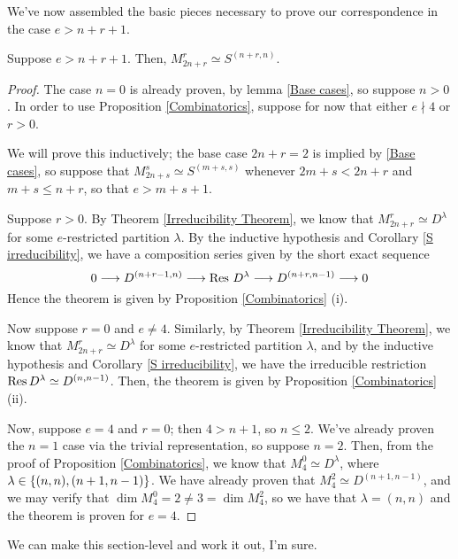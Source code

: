 \documentclass{amsart}
\begin{document}
We've now assembled the basic pieces necessary to prove our correspondence in the case $e > n + r + 1$.

\begin{theorem}\label{Correspondence Theorem}
  Suppose $e > n + r + 1$.
  Then, $M_{2n + r}^r \simeq S^{(n+r,n)}$.
\end{theorem}
\begin{proof}
  The case $n = 0$ is already proven, by lemma \ref{Base cases}, so suppose $n > 0$.
  In order to use Proposition \ref{Combinatorics}, suppose for now that either $e \nmid 4$ or $r > 0$.

  We will prove this inductively; the base case $2n + r = 2$ is implied by \ref{Base cases}, so suppose that $M_{2n + s}^s \simeq S^{(m+s,s)}$ whenever $2m + s < 2n + r$ and $m + s \leq n + r$, so that $e > m + s + 1$.

  Suppose $r > 0$.
  By Theorem \ref{Irreducibility Theorem}, we know that $M_{2n + r}^r \simeq D^\lambda$ for some $e$-restricted partition $\lambda$.
  By the inductive hypothesis and Corollary \ref{S irreducibility}, we have a composition series given by the short exact sequence
  \begin{equation}
    \label{Composition Series} 0 \longrightarrow D^{(n + r - 1,n)} \longrightarrow \operatorname{Res} \, D^\lambda \longrightarrow D^{(n+r,n-1)} \longrightarrow 0
   \end{equation}
  Hence the theorem is given by Proposition \ref{Combinatorics} (i).

  Now suppose $r = 0$ and $e \neq 4$.
  Similarly, by Theorem \ref{Irreducibility Theorem}, we know that $M_{2n + r}^r \simeq D^\lambda$ for some $e$-restricted partition $\lambda$, and by the inductive hypothesis and Corollary \ref{S irreducibility}, we have the irreducible restriction $\operatorname{Res} D^\lambda \simeq D^{(n,n-1)}$.
  Then, the theorem is given by Proposition \ref{Combinatorics} (ii).

  Now, suppose $e = 4$ and $r = 0$;
  then $4 > n + 1$, so $n \leq 2$.
  We've already proven the $n = 1$ case via the trivial representation, so suppose $n = 2$.
  Then, from the proof of Proposition \ref{Combinatorics}, we know that $M_{4}^0 \simeq D^\lambda$, where $\lambda \in \left\{ (n,n), (n+1,n-1) \right\}$.
  We have already proven that $M_4^2 \simeq D^{(n+1,n-1)}$, and we may verify that $\dim M_4^0 = 2 \neq 3 = \dim M_4^2$, so we have that $\lambda = (n,n)$ and the theorem is proven for $e = 4$.
\end{proof}

{\color{magenta} We can make this section-level and work it out, I'm sure.}
\end{document}
